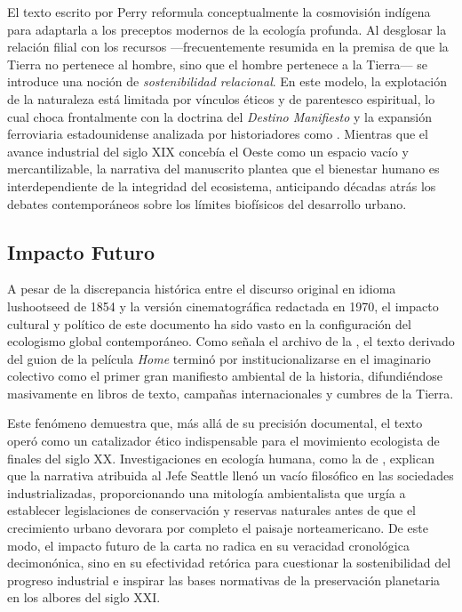 El texto escrito por Perry \citep{perry1970home} reformula conceptualmente la cosmovisión indígena para
adaptarla a los preceptos modernos de la ecología profunda. Al desglosar la relación filial con los
recursos ---frecuentemente resumida en la premisa de que la Tierra no pertenece al hombre, sino que el
hombre pertenece a la Tierra--- se introduce una noción de \textit{sostenibilidad relacional}. En este
modelo, la explotación de la naturaleza está limitada por vínculos éticos y de parentesco espiritual, lo
cual choca frontalmente con la doctrina del \textit{Destino Manifiesto} y la expansión ferroviaria
estadounidense analizada por historiadores como \citet{white1991it}. Mientras que el avance industrial
del siglo XIX concebía el Oeste como un espacio vacío y mercantilizable, la narrativa del manuscrito
plantea que el bienestar humano es interdependiente de la integridad del ecosistema, anticipando
décadas atrás los debates contemporáneos sobre los límites biofísicos del desarrollo urbano.

\subsection{Impacto Futuro}
\label{ssec:impacto-futuro}
A pesar de la discrepancia histórica entre el discurso original en idioma lushootseed de 1854 y la
versión cinematográfica redactada en 1970, el impacto cultural y político de este documento ha sido
vasto en la configuración del ecologismo global contemporáneo. Como señala el archivo de la
\citet{washingtonHist}, el texto derivado del guion de la película \textit{Home} terminó por
institucionalizarse en el imaginario colectivo como el primer gran manifiesto ambiental de la historia,
difundiéndose masivamente en libros de texto, campañas internacionales y cumbres de la Tierra.

Este fenómeno demuestra que, más allá de su precisión documental, el texto operó como un catalizador ético
indispensable para el movimiento ecologista de finales del siglo XX. Investigaciones en ecología humana,
como la de \citet{abruzzi2000myth}, explican que la narrativa atribuida al Jefe Seattle llenó un vacío
filosófico en las sociedades industrializadas, proporcionando una mitología ambientalista que urgía a
establecer legislaciones de conservación y reservas naturales antes de que el crecimiento urbano devorara
por completo el paisaje norteamericano. De este modo, el impacto futuro de la carta no radica en su
veracidad cronológica decimonónica, sino en su efectividad retórica para cuestionar la sostenibilidad
del progreso industrial e inspirar las bases normativas de la preservación planetaria en los albores
del siglo XXI.
